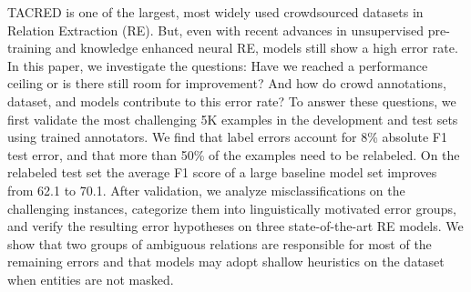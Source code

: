 TACRED is one of the largest, most widely used crowdsourced datasets in Relation Extraction (RE). But, even with recent advances in unsupervised pre-training and knowledge enhanced neural RE, models still show a high error rate. In this paper, we investigate the questions: Have we reached a performance ceiling or is there still room for improvement? And how do crowd annotations, dataset, and models contribute to this error rate? To answer these questions, we first validate the most challenging 5K examples in the development and test sets using trained annotators. We find that label errors account for 8\% absolute F1 test error, and that more than 50\% of the examples need to be relabeled. On the relabeled test set the average F1 score of a large baseline model set improves from 62.1 to 70.1. After validation, we analyze misclassifications on the challenging instances, categorize them into linguistically motivated error groups, and verify the resulting error hypotheses on three state-of-the-art RE models. We show that two groups of ambiguous relations are responsible for most of the remaining errors and that models may adopt shallow heuristics on the dataset when entities are not masked.
